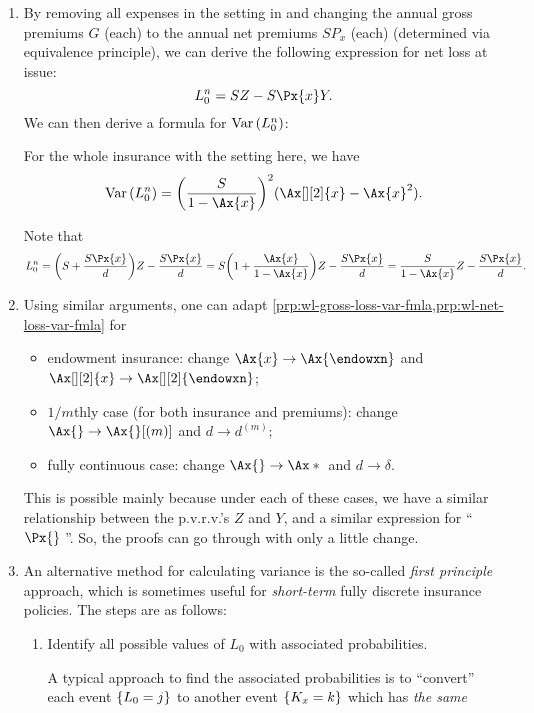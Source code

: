 \begin{enumerate}
\item By removing all expenses in the setting in 
and changing the annual gross premiums \(G\) (each) to the annual net premiums
\(SP_x\) (each) (determined via equivalence principle), we can derive the
following expression for net loss at issue:
\[
L_0^n=SZ-S\Px{x}Y.
\]
We can then derive a formula for \(\operatorname{Var}\qty(L_0^n)\):
\begin{proposition}
\label{prp:wl-net-loss-var-fmla}
For the whole insurance with the setting here, we have
\[
\vari{L_0^n}=\qty(\frac{S}{1-\Ax{x}})^{2}(\Ax[][2]{x}-\Ax{x}^2).
\]
\end{proposition}
\begin{pf}
Note that
\[
L_0^n=\qty(S+\frac{S\Px{x}}{d})Z-\frac{S\Px{x}}{d}
=S\qty(1+\frac{\Ax{x}}{1-\Ax{x}})Z-\frac{S\Px{x}}{d}
=\frac{S}{1-\Ax{x}}Z-\frac{S\Px{x}}{d}.
\]
\end{pf}
\item Using similar arguments, one can adapt
\cref{prp:wl-gross-loss-var-fmla,prp:wl-net-loss-var-fmla} for
\begin{itemize}
\item endowment insurance: change \(\Ax{x}\to\Ax{\endowxn}\) and \(\Ax[][2]{x}\to\Ax[][2]{\endowxn}\);
\item \(1/m\)thly case (for both insurance and premiums): change
\(\Ax{}\to\Ax{}[(m)]\) and \(d\to d^{(m)}\);
\item fully continuous case: change \(\Ax{}\to\Ax*{}\) and \(d\to\delta\).
\end{itemize}
\begin{note}
This is possible mainly because under each of these cases, we have a similar
relationship between the p.v.r.v.'s \(Z\) and \(Y\), and a similar expression
for ``\(\Px{}\;\)''. So, the proofs can go through with only a little change.
\end{note}
\item \label{it:first-principle-cal-var}
An alternative method for calculating variance is the so-called \emph{first
principle} approach, which is sometimes useful for \emph{short-term} fully
discrete insurance policies. The steps are as follows:
\begin{enumerate}
\item Identify all possible values of \(L_0\) with associated probabilities.
\begin{note}
A typical approach to find the associated probabilities is to ``convert'' each
event \(\qty{L_0=j}\) to another event \(\qty{K_x=k}\) which has \emph{the same
}
\end{note}
\end{enumerate}
\end{enumerate}
